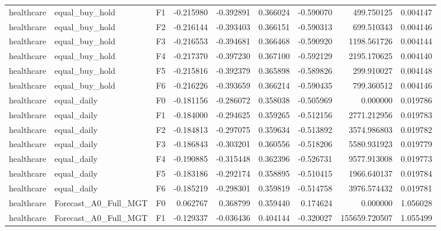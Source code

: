 \begin{tabular}{lllrrrrrr}
healthcare &               equal\_buy\_hold &  F1 & -0.215980 & -0.392891 & 0.366024 & -0.590070 &       499.750125 &             0.004147 \\
healthcare &               equal\_buy\_hold &  F2 & -0.216144 & -0.393403 & 0.366151 & -0.590313 &       699.510343 &             0.004146 \\
healthcare &               equal\_buy\_hold &  F3 & -0.216553 & -0.394681 & 0.366468 & -0.590920 &      1198.561726 &             0.004144 \\
healthcare &               equal\_buy\_hold &  F4 & -0.217370 & -0.397230 & 0.367100 & -0.592129 &      2195.170625 &             0.004140 \\
healthcare &               equal\_buy\_hold &  F5 & -0.215816 & -0.392379 & 0.365898 & -0.589826 &       299.910027 &             0.004148 \\
healthcare &               equal\_buy\_hold &  F6 & -0.216226 & -0.393659 & 0.366214 & -0.590435 &       799.360512 &             0.004146 \\
healthcare &                  equal\_daily &  F0 & -0.181156 & -0.286072 & 0.358038 & -0.505969 &         0.000000 &             0.019786 \\
healthcare &                  equal\_daily &  F1 & -0.184000 & -0.294625 & 0.359265 & -0.512156 &      2771.212956 &             0.019783 \\
healthcare &                  equal\_daily &  F2 & -0.184813 & -0.297075 & 0.359634 & -0.513892 &      3574.986803 &             0.019782 \\
healthcare &                  equal\_daily &  F3 & -0.186843 & -0.303201 & 0.360556 & -0.518206 &      5580.931923 &             0.019779 \\
healthcare &                  equal\_daily &  F4 & -0.190885 & -0.315448 & 0.362396 & -0.526731 &      9577.913008 &             0.019773 \\
healthcare &                  equal\_daily &  F5 & -0.183186 & -0.292174 & 0.358895 & -0.510415 &      1966.640137 &             0.019784 \\
healthcare &                  equal\_daily &  F6 & -0.185219 & -0.298301 & 0.359819 & -0.514758 &      3976.574432 &             0.019781 \\
healthcare &         Forecast\_A0\_Full\_MGT &  F0 &  0.062767 &  0.368799 & 0.359440 &  0.174624 &         0.000000 &             1.056028 \\
healthcare &         Forecast\_A0\_Full\_MGT &  F1 & -0.129337 & -0.036436 & 0.404144 & -0.320027 &    155659.720507 &             1.055499 \\

\end{tabular}
